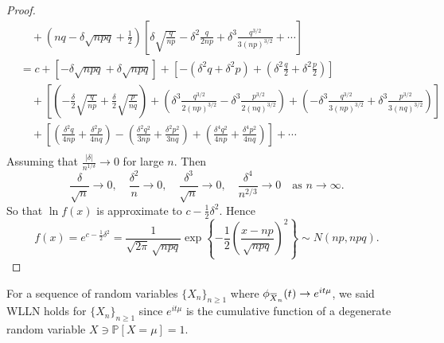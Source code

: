 \begin{proof}
\begin{align*}
        &\quad + \left(nq - \delta \sqrt{npq} + \frac{1}{2} \right)\left[ \delta \sqrt{\frac{q}{np}} - \delta^2 \frac{q}{2np} + \delta^3 \frac{q^{3/2}}{3(np)^{3/2}} + \cdots \right]\\
        &=c + \left[ -\delta \sqrt{npq} + \delta \sqrt{npq} \right] 
        + \left[-(\delta^2q + \delta^2p) + \left(\delta^2 \frac{q}{2} + \delta^2 \frac{p}{2}\right)\right]\\
        &\quad + \left[ \left(- \frac{\delta}{2} \sqrt{\frac{q}{np}} + \frac{\delta}{2} \sqrt{\frac{p}{nq}} \right) 
            + \left( \delta^3 \frac{q^{3/2}}{2(np)^{3/2}} - \delta^3 \frac{p^{3/2}}{2(nq)^{3/2}} \right) 
        + \left( -\delta^3 \frac{q^{3/2}}{3(np)^{3/2}} + \delta^3 \frac{p^{3/2}}{3(nq)^{3/2}} \right) \right]\\
        &\quad + \left[ \left(\frac{\delta^2q}{4np} + \frac{\delta^2p}{4nq} \right) - \left(\frac{\delta^2q^2}{3np} + \frac{\delta^2p^2}{3nq} \right) 
        + \left(\frac{\delta^4q^2}{4np} + \frac{\delta^4p^2}{4nq} \right) \right] + \cdots\\
    \end{align*}
    Assuming that $\frac{|\delta|}{n^{1/\delta}} \to 0$ for large $n$. Then
    \[
        \frac{\delta}{\sqrt{n}} \to 0, \quad \frac{\delta^2}{n} \to 0, \quad \frac{\delta^3}{\sqrt{n}} \to 0, \quad
        \frac{\delta^4}{n^{2/3}} \to 0 \quad \text{as } n \to \infty.
    \]
    So that $\ln f(x)$ is approximate to $c - \frac{1}{2}\delta^2$. Hence 
    \[
        f(x) = e^{c - \frac{1}{2}\delta^2} = \frac{1}{\sqrt{2\pi} \, \sqrt{npq}} \exp \left\{ -\frac{1}{2} \left(\frac{x -np}{\sqrt{npq}}\right)^2 \right\} \sim N(np, npq).
    \]
\end{proof}
\begin{remark}
    For a sequence of random variables $\{X_n\}_{n \geq 1}$ where 
    $\phi_{\ols{X}_n}(t) \to e^{it\mu}$, we said WLLN holds for $\{X_n\}_{n \geq 1}$ since $e^{it\mu}$ is the 
    cumulative function of a degenerate random variable $X \ni \mathbb{P}[X=\mu]=1$.
\end{remark}

